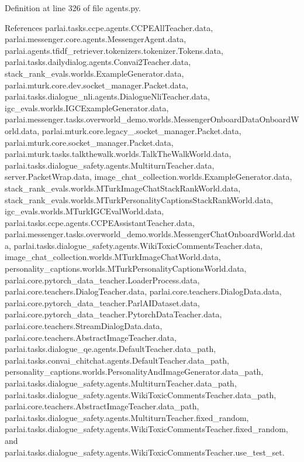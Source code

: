 Definition at line 326 of file agents.\+py.



References parlai.\+tasks.\+ccpe.\+agents.\+C\+C\+P\+E\+All\+Teacher.\+data, parlai.\+messenger.\+core.\+agents.\+Messenger\+Agent.\+data, parlai.\+agents.\+tfidf\+\_\+retriever.\+tokenizers.\+tokenizer.\+Tokens.\+data, parlai.\+tasks.\+dailydialog.\+agents.\+Convai2\+Teacher.\+data, stack\+\_\+rank\+\_\+evals.\+worlds.\+Example\+Generator.\+data, parlai.\+mturk.\+core.\+dev.\+socket\+\_\+manager.\+Packet.\+data, parlai.\+tasks.\+dialogue\+\_\+nli.\+agents.\+Dialogue\+Nli\+Teacher.\+data, igc\+\_\+evals.\+worlds.\+I\+G\+C\+Example\+Generator.\+data, parlai.\+messenger.\+tasks.\+overworld\+\_\+demo.\+worlds.\+Messenger\+Onboard\+Data\+Onboard\+World.\+data, parlai.\+mturk.\+core.\+legacy\+\_.\+socket\+\_\+manager.\+Packet.\+data, parlai.\+mturk.\+core.\+socket\+\_\+manager.\+Packet.\+data, parlai.\+mturk.\+tasks.\+talkthewalk.\+worlds.\+Talk\+The\+Walk\+World.\+data, parlai.\+tasks.\+dialogue\+\_\+safety.\+agents.\+Multiturn\+Teacher.\+data, server.\+Packet\+Wrap.\+data, image\+\_\+chat\+\_\+collection.\+worlds.\+Example\+Generator.\+data, stack\+\_\+rank\+\_\+evals.\+worlds.\+M\+Turk\+Image\+Chat\+Stack\+Rank\+World.\+data, stack\+\_\+rank\+\_\+evals.\+worlds.\+M\+Turk\+Personality\+Captions\+Stack\+Rank\+World.\+data, igc\+\_\+evals.\+worlds.\+M\+Turk\+I\+G\+C\+Eval\+World.\+data, parlai.\+tasks.\+ccpe.\+agents.\+C\+C\+P\+E\+Assistant\+Teacher.\+data, parlai.\+messenger.\+tasks.\+overworld\+\_\+demo.\+worlds.\+Messenger\+Chat\+Onboard\+World.\+data, parlai.\+tasks.\+dialogue\+\_\+safety.\+agents.\+Wiki\+Toxic\+Comments\+Teacher.\+data, image\+\_\+chat\+\_\+collection.\+worlds.\+M\+Turk\+Image\+Chat\+World.\+data, personality\+\_\+captions.\+worlds.\+M\+Turk\+Personality\+Captions\+World.\+data, parlai.\+core.\+pytorch\+\_\+data\+\_\+teacher.\+Loader\+Process.\+data, parlai.\+core.\+teachers.\+Dialog\+Teacher.\+data, parlai.\+core.\+teachers.\+Dialog\+Data.\+data, parlai.\+core.\+pytorch\+\_\+data\+\_\+teacher.\+Parl\+A\+I\+Dataset.\+data, parlai.\+core.\+pytorch\+\_\+data\+\_\+teacher.\+Pytorch\+Data\+Teacher.\+data, parlai.\+core.\+teachers.\+Stream\+Dialog\+Data.\+data, parlai.\+core.\+teachers.\+Abstract\+Image\+Teacher.\+data, parlai.\+tasks.\+dialogue\+\_\+qe.\+agents.\+Default\+Teacher.\+data\+\_\+path, parlai.\+tasks.\+convai\+\_\+chitchat.\+agents.\+Default\+Teacher.\+data\+\_\+path, personality\+\_\+captions.\+worlds.\+Personality\+And\+Image\+Generator.\+data\+\_\+path, parlai.\+tasks.\+dialogue\+\_\+safety.\+agents.\+Multiturn\+Teacher.\+data\+\_\+path, parlai.\+tasks.\+dialogue\+\_\+safety.\+agents.\+Wiki\+Toxic\+Comments\+Teacher.\+data\+\_\+path, parlai.\+core.\+teachers.\+Abstract\+Image\+Teacher.\+data\+\_\+path, parlai.\+tasks.\+dialogue\+\_\+safety.\+agents.\+Multiturn\+Teacher.\+fixed\+\_\+random, parlai.\+tasks.\+dialogue\+\_\+safety.\+agents.\+Wiki\+Toxic\+Comments\+Teacher.\+fixed\+\_\+random, and parlai.\+tasks.\+dialogue\+\_\+safety.\+agents.\+Wiki\+Toxic\+Comments\+Teacher.\+use\+\_\+test\+\_\+set.



